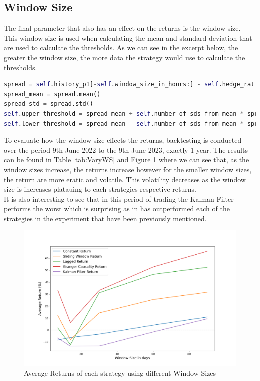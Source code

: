 \subsection{Window Size}
The final parameter that also has an effect on the returns is the window size. This window size is used when calculating the mean and standard deviation that are used to calculate the thresholds. As we can see in the excerpt below, the greater the window size, the more data the strategy would use to calculate the thresholds.
\vspace{5mm}
\begin{lstlisting}[language=Python]
spread = self.history_p1[-self.window_size_in_hours:] - self.hedge_ratio * self.history_p2[-self.window_size_in_hours:]
spread_mean = spread.mean()
spread_std = spread.std()
self.upper_threshold = spread_mean + self.number_of_sds_from_mean * spread_std
self.lower_threshold = spread_mean - self.number_of_sds_from_mean * spread_std
\end{lstlisting}
\vspace{5mm}
To evaluate how the window size effects the returns, backtesting is conducted over the period 9th June 2022 to the 9th June 2023, exactly 1 year. The results can be found in Table \ref{tab:VaryWS} and Figure \ref{fig:VaryWS} where we can see that, as the window sizes increase, the returns increase however for the smaller window sizes, the return are more eratic and volatile. This volatility decreases as the window size is increases platauing to each strategies respective returns.
\\[5mm]
It is also interesting to see that in this period of trading the Kalman Filter performs the worst which is surprising as in has outperformed each of the strategies in the experiment that have been previously mentioned.

\begin{figure}[H]
    \centering
    \includegraphics[width=\linewidth]{evaluation/Images/VarWS.png}
    \caption{Average Returns of each strategy using different Window Sizes}
    \label{fig:VaryWS}
\end{figure}

